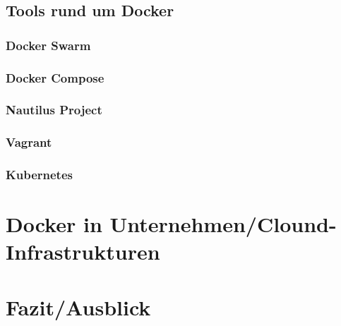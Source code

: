 \documentclass[11pt,a4paper,oneside]{report}
\begin{document}
	\section{Tools rund um Docker}
		\subsection{Docker Swarm}
		\subsection{Docker Compose}
		\subsection{Nautilus Project}
		\subsection{Vagrant}
		\subsection{Kubernetes}
\chapter{Docker in Unternehmen/Clound-Infrastrukturen}

\chapter{Fazit/Ausblick}




\appendix


\end{document}
